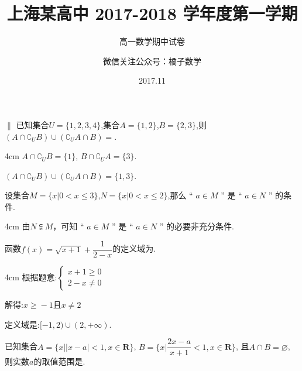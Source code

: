 \documentclass[fontset=ubuntu,list]{BHCexam}
\begin{document}
\title{上海某高中 2017-2018 学年度第一学期}
\subtitle{高一数学期中试卷}
\author{微信关注公众号：橘子数学}
\date{2017.11}
\maketitle
\begin{groups}

\begin{questions}[sp]
\question [4] $\parallel$ 已知集合$U=\{1,2,3,4\}$,集合$A=\{1,2\}$,$B=\{2,3\}$,则$(A\cap\complement_UB) \cup (\complement_UA\cap B)=$.

\begin{solution}{4cm}
\method
$A\cap\complement_UB=\{1\}$, $B\cap\complement_UA=\{3\}$.

$(A\cap\complement_UB) \cup (\complement_UA\cap B)=\{1,3\}$.

\end{solution}
\vfill
\begin{minipage}{\linewidth}
\question [4] 设集合$M=\{x|0\lt x\leqslant{}3\}$,$N=\{x|0\lt x\leqslant{}2\}$,那么 “ $a\in{M}$ ” 是 “ $a\in{N}$ ” 的条件.

\end{minipage}
\begin{solution}{4cm}
\method
由$N \subsetneqq M$，可知 “ $a\in{M}$ ” 是 “ $a\in{N}$ ” 的必要非充分条件.

\end{solution}
\vfill
\begin{minipage}{\linewidth}
\question [4] 函数$f(x)=\sqrt{x+1}+\dfrac{1}{2-x}$的定义域为\key{$[-1,2)\cup{}(2,+\infty)$}.

\end{minipage}
\begin{solution}{4cm}
\method
根据题意:$\left\{\begin{array}{l}{x+1\geqslant{}0}\\{2-x\neq{}0}\end{array}\right.$

解得:$x\geqslant{}-1$且$x\neq{}2$

定义域是:$[-1,2)\cup{}(2,+\infty)$.

\end{solution}
\vfill
\begin{minipage}{\linewidth}
\question [4] 已知集合$A=\{x \big| |x-a| \lt 1,x\in\symbf{R}\}$,
$B=\{x\Big|\dfrac{2x-a}{x+1} \lt 1,x\in\symbf{R}\}$,
且$A\cap B=\varnothing$,
 则实数$a$的取值范围是\key{$a \in (-\infty,-2]$}.


\end{minipage}
\end{questions}
\end{groups}
\end{document}
